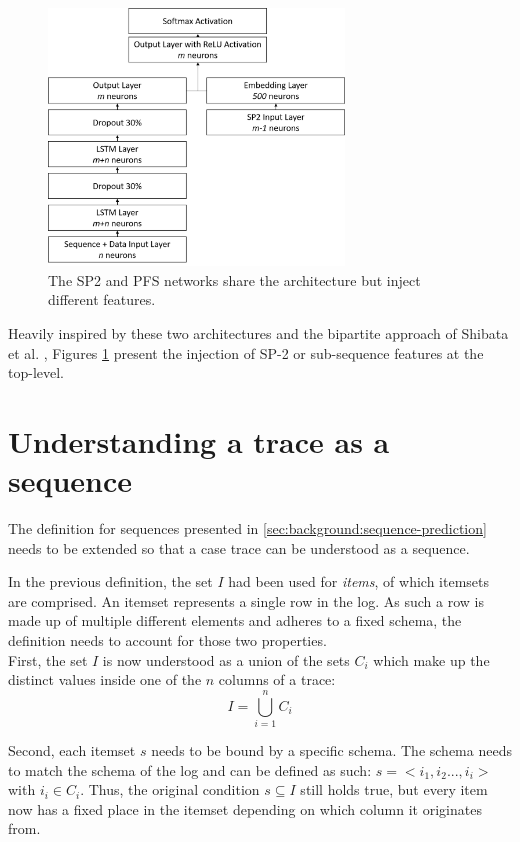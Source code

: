 \begin{figure}
    \centering
    \includegraphics[width=0.7\textwidth]{gfx/sp2-network-architecture.png}
    \caption{The SP2 and PFS networks share the architecture but inject different features.}
    \label{fig:sp2-pfs-architecture}
\end{figure}

Heavily inspired by these two architectures and the bipartite approach of Shibata et al. \cite{shibata2016bipartite}, Figures \ref{fig:sp2-pfs-architecture} present the injection of SP-2 or sub-sequence features at the top-level.

\section{Understanding a trace as a sequence}
The definition for sequences presented in \autoref{sec:background:sequence-prediction} needs to be extended so that a case trace can be understood as a sequence.

In the previous definition, the set $I$ had been used for \textit{items}, of which itemsets are comprised. An itemset represents a single row in the log. As such a row is made up of multiple different elements and adheres to a fixed schema, the definition needs to account for those two properties.\\

First, the set $I$ is now understood as a union of the sets $C_i$ which make up the distinct values inside one of the $n$ columns of a trace:
$$I = \bigcup\limits_{i=1}^{n} C_{i}$$

Second, each itemset $s$ needs to be bound by a specific schema. The schema needs to match the schema of the log and can be defined as such: $s = <i_1, i_2 ..., i_i>$ with $i_i \in C_i$. Thus, the original condition $s \subseteq I$ still holds true, but every item now has a fixed place in the itemset depending on which column it originates from.

